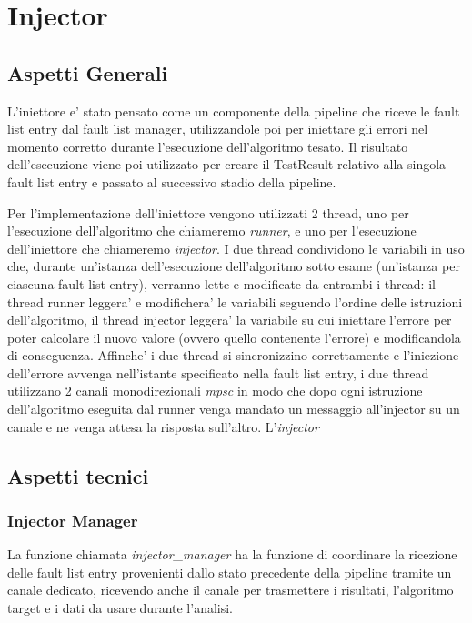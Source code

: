 \newpage
\section{Injector}\label{sec: Injector}
\subsection{Aspetti Generali}
L'iniettore e' stato pensato come un componente della pipeline che riceve le fault list entry dal fault list manager, utilizzandole poi per iniettare gli errori nel momento 
corretto durante l'esecuzione dell'algoritmo tesato. Il risultato dell'esecuzione viene poi utilizzato per creare il TestResult relativo alla singola fault list entry e passato 
al successivo stadio della pipeline. 

Per l'implementazione dell'iniettore vengono utilizzati 2 thread, uno per l'esecuzione dell'algoritmo che chiameremo \textit{runner}, e uno per l'esecuzione dell'i\-niettore che 
chiameremo \textit{injector}. I due thread condividono le variabili in uso che, durante un'istanza dell'esecuzione dell'algoritmo sotto esame (un'istanza per ciascuna fault list 
entry), verranno lette e modificate da entrambi i thread: il thread runner leggera' e modifichera' le variabili seguendo l'ordine delle istruzioni dell'algoritmo, il thread
injector leggera' la variabile su cui iniettare l'errore per poter calcolare il nuovo valore (ovvero quello contenente l'errore) e modificandola di conseguenza. Affinche' i due 
thread si sincronizzino correttamente e l'iniezione dell'errore avvenga nell'istante specificato nella fault list entry, i due thread utilizzano 2 canali monodirezionali \textit{mpsc} in modo che 
dopo ogni istruzione dell'algoritmo eseguita dal runner venga mandato un messaggio all'injector su un canale e ne venga attesa la risposta sull'altro. L'\textit{injector}

\subsection{Aspetti tecnici}
\subsubsection{Injector Manager}
La funzione chiamata \textit{injector\_manager} ha la funzione di coordinare la ricezione delle fault list entry provenienti dallo stato precedente della pipeline tramite un canale dedicato, ricevendo anche il canale per trasmettere i risultati, l'algoritmo target e i dati da usare durante l'analisi.


